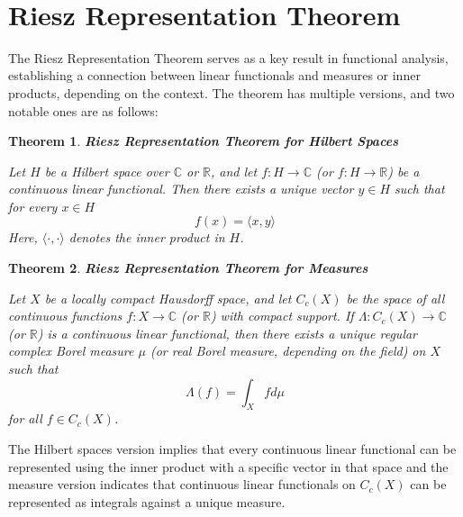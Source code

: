 \documentclass{article}
\newcommand{\cdummy}{\cdot}
\newcommand{\tmstrong}[1]{\textbf{#1}}
\newtheorem{theorem}{Theorem}
\begin{document}
\

\section{Riesz Representation
Theorem}\label{riesz-representation-theorem}\label{riesz-representation-theorem}

The Riesz Representation Theorem serves as a key result in functional
analysis, establishing a connection between linear functionals and measures or
inner products, depending on the context. The theorem has multiple versions,
and two notable ones are as
follows:\label{riesz-representation-theorem-for-hilbert-spaces}\label{riesz-representation-theorem-for-hilbert-spaces}

\begin{theorem}
  {\tmstrong{Riesz Representation Theorem for Hilbert Spaces}}
  
  Let $H$ be a Hilbert space over $\mathbb{C}$ or $\mathbb{R}$, and let $f : H
  \rightarrow \mathbb{C}$ (or $f : H \rightarrow \mathbb{R}$) be a continuous
  linear functional. Then there exists a unique vector $y \in H$ such that for
  every $x \in H$
  \begin{equation}
    f (x) = \langle x, y \rangle
  \end{equation}
  Here, $\langle \cdummy, \cdummy \rangle$ denotes the inner product in $H$.
\end{theorem}

\begin{theorem}
  {\tmstrong{Riesz Representation Theorem for Measures}}
  
  Let $X$ be a locally compact Hausdorff space, and let $C_c (X)$ be the space
  of all continuous functions $f : X \rightarrow \mathbb{C}$ (or $\mathbb{R}$)
  with compact support. If $\Lambda : C_c (X) \rightarrow \mathbb{C}$ (or
  $\mathbb{R}$) is a continuous linear functional, then there exists a unique
  regular complex Borel measure $\mu$ (or real Borel measure, depending on the
  field) on $X$ such that
  \begin{equation}
    \Lambda (f) = \int_X fd \mu
  \end{equation}
  for all $f \in C_c (X)$.
\end{theorem}

The Hilbert spaces version implies that every continuous linear functional can
be represented using the inner product with a specific vector in that space
and the measure version indicates that continuous linear functionals on $C_c
(X)$ can be represented as integrals against a unique measure.
\end{document}
